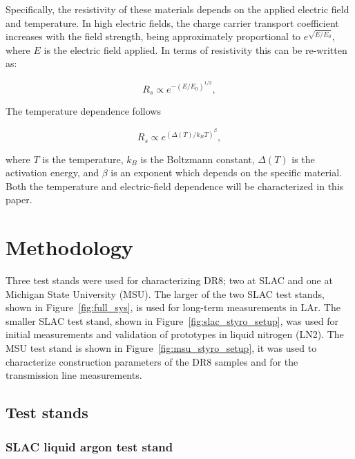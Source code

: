 \documentclass[a4paper,12pt]{article}
\newcommand{\DR}{DR8}
\begin{document}
Specifically, the resistivity of these materials depends on the applied electric field and temperature.  
In high electric fields, the charge carrier transport coefficient increases with the field strength, being approximately proportional to $e^{\sqrt{E/E_0}}$, where $E$ is the electric field applied. 
In terms of resistivity this can be re-written as:

\begin{equation}
\label{eq:efield}
{R_s} \propto e^{- (E / E_0)^{1/2}},
\end{equation}

The temperature dependence follows

\begin{equation}
\label{eq:Tdep}
R_s \propto  e^{( \Delta(T) / k_B T)^{\beta}},
\end{equation}

where $T$ is the temperature, $k_B$ is the Boltzmann constant, $\Delta(T)$ is the activation energy, and $\beta$ is an exponent which depends on the specific material.
Both the temperature and electric-field dependence will be characterized in this paper.  


\section{Methodology}
\label{sec:expsetup}

Three test stands were used for characterizing {\DR}; two at SLAC and one at Michigan State University (MSU).
The larger of the two SLAC test stands, shown in Figure~\ref{fig:full_sys}, is used for long-term measurements in LAr.    
The smaller SLAC test stand, shown in Figure~\ref{fig:slac_styro_setup}, was used for initial measurements and validation of prototypes in liquid nitrogen (LN2). 
The MSU test stand is shown in Figure~\ref{fig:msu_styro_setup}, it was used to characterize construction parameters of the {\DR} samples and for the transmission line measurements.  

\subsection{Test stands}
\subsubsection{SLAC liquid argon test stand}
\end{document}
